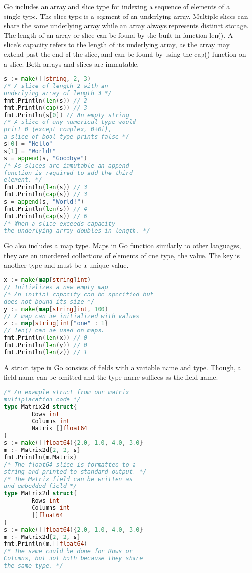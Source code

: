 Go includes an array and slice type for indexing a sequence of elements of a single type. The slice type is a segment of an underlying array. Multiple slices can share the same underlying array while an array always represents distinct storage. The length of an array or slice can be found by the built-in function len(). A slice's capacity refers to the length of its underlying array, as the array may extend past the end of the slice, and can be found by using the cap() function on a slice. Both arrays and slices are immutable.
\cite{website:go-lang-spec}
\begin{lstlisting}[language=Go]
s := make([]string, 2, 3)
/* A slice of length 2 with an
underlying array of length 3 */
fmt.Println(len(s)) // 2
fmt.Println(cap(s)) // 3
fmt.Println(s[0]) // An empty string
/* A slice of any numerical type would
print 0 (except complex, 0+0i),
a slice of bool type prints false */
s[0] = "Hello"
s[1] = "World!"
s = append(s, "Goodbye")
/* As slices are immutable an append
function is required to add the third
element. */
fmt.Println(len(s)) // 3
fmt.Println(cap(s)) // 3
s = append(s, "World!")
fmt.Println(len(s)) // 4
fmt.Println(cap(s)) // 6
/* When a slice exceeds capacity
the underlying array doubles in length. */
\end{lstlisting}
Go also includes a map type. Maps in Go function similarly to other languages, they are an unordered collections of elements of one type, the value. The key is another type and must be a unique value. \cite{website:go-lang-spec}
\begin{lstlisting}[language=Go]
x := make(map[string]int)
// Initializes a new empty map
/* An initial capacity can be specified but
does not bound its size */
y := make(map[string]int, 100)
// A map can be initialized with values 
z := map[string]int{"one" : 1}
// len() can be used on maps.
fmt.Println(len(x)) // 0
fmt.Println(len(y)) // 0
fmt.Println(len(z)) // 1
\end{lstlisting}
A struct type in Go consists of fields with a variable name and type. Though, a field name can be omitted and the type name suffices as the field name. \cite{website:go-lang-spec}
\begin{lstlisting}[language=Go]
/* An example struct from our matrix
multiplacation code */
type Matrix2d struct{
        Rows int
        Columns int
        Matrix []float64
}
s := make([]float64){2.0, 1.0, 4.0, 3.0}
m := Matrix2d{2, 2, s}
fmt.Println(m.Matrix)
/* The float64 slice is formatted to a
string and printed to standard output. */
/* The Matrix field can be written as
and embedded field */
type Matrix2d struct{
        Rows int
        Columns int
        []float64
}
s := make([]float64){2.0, 1.0, 4.0, 3.0}
m := Matrix2d{2, 2, s}
fmt.Println(m.[]float64)
/* The same could be done for Rows or
Columns, but not both because they share
the same type. */
\end{lstlisting}
